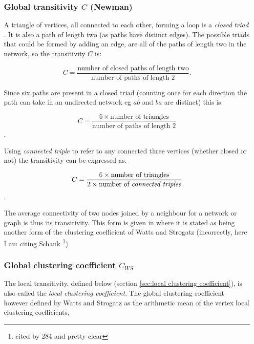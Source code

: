 \subsubsection{Global transitivity $C$ (Newman)}
\label{sec:global transitivity newman}
A triangle of vertices,  all connected to each other, forming a loop is  a \textit{closed triad} \cite{newman2018networks}.
It is also a path of length two (as paths have distinct edges). The possible triads that could be formed by adding an edge, are all of the paths of length two in the network, so the transitivity $C$ is:

\begin{equation}
    C = \frac{\textrm{number of closed paths of length two}}{\textrm{number of paths of length 2}}.
    \label{eq:Transitivity newman}
\end{equation}

Since six paths are present in a closed triad (counting once for each direction the path can take in an undirected network eg $ab$ and $ba$ are distinct) this is:

\begin{equation}
    C = \frac{6 \times \textrm{number of triangles}}{\textrm{number of paths of length 2}}
\end{equation}.

Using \textit{connected triple} to refer to any connected three vertices (whether closed or not) the transitivity can be expressed as.

\begin{equation}
    C = \frac{6 \times \textrm{number of triangles}}{2 \times \textrm{number of \textit{connected triples}}}
      \label{eq:Transitivity newman - triples}
\end{equation}.

The average connectivity of two nodes joined by a neighbour for a network or graph is thus its transitivity\cite{newman2001structure}\cite{newman2018networks}. This form is given in \cite{newman2002random} where it is stated as being another form of the clustering coefficient of Watts and Strogatz (incorrectly, here I am citing Schank \cite{schank2005approximating}  \footnote{cited by 284 and pretty clear})



\subsubsection{Global clustering coefficient $C_{WS}$}
\label{sec:Global clustering coefficient}
The local transitivity. defined below (section \ref{sec:local clustering coefficient}), is also called the \textit{local clustering coefficient}. The global clustering coefficient however defined by Watts and Strogatz\cite{watts1998collective} as the arithmetic mean of the vertex local clustering coefficients\cite{estrada2016local},


